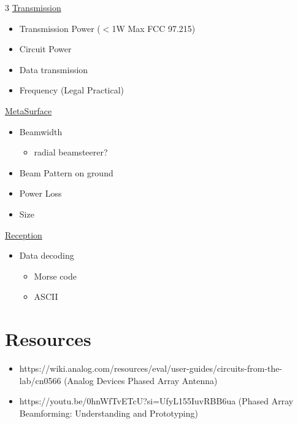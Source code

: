 \documentclass{article}
\begin{document}
	\begin{multicols}{3}
		\underline{Transmission}
		\begin{itemize}
			\item Transmission Power ($<$1W Max FCC 97.215)
			\item Circuit Power
			\item Data transmission
			\item Frequency (Legal Practical)
		\end{itemize}
		\columnbreak
	
		\underline{MetaSurface}
		\begin{itemize}
			\item Beamwidth 
			\begin{itemize}
				\item radial beamsteerer?	
			\end{itemize} 
			\item Beam Pattern on ground
			\item Power Loss
			\item Size
			
		\end{itemize}
		\columnbreak
	
		\underline{Reception}
		\begin{itemize}
			\item Data decoding
			\begin{itemize}
				\item Morse code
				\item ASCII
			\end{itemize}
		\end{itemize}
		\columnbreak
	\end{multicols}	
	\section{Resources}
	\begin{itemize}
		\item https://wiki.analog.com/resources/eval/user-guides/circuits-from-the-lab/cn0566 (Analog Devices Phased Array Antenna)
		\item https://youtu.be/0hnWfTvETcU?si=UfyL155IuvRBB6ua (Phased Array Beamforming: Understanding and Prototyping)
	\end{itemize}
	
	
	
	
	
\end{document}
